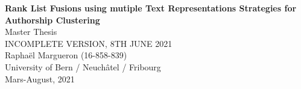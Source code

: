 \documentclass{article}
\theoremstyle{definition}
\begin{document}
\setcounter{page}{-1}

\date{Mars-August, 2021}
\author{Raphaël Margueron}

\begin{titlepage}
\vspace*{\fill}
\begin{center}
{\LARGE \textbf{Rank List Fusions using mutiple Text Representations Strategies for Authorship Clustering}}
\\[0.5cm]
{\large Master Thesis}
\\[0.5cm]
{\large \color{red} INCOMPLETE VERSION, 8TH JUNE 2021}
\\[8.0cm]
{\large Raphaël Margueron (16-858-839)}
\\[0.5cm]
{\large University of Bern / Neuchâtel / Fribourg}
\\[0.5cm]
{\large Mars-August, 2021}
\\[0.5cm]
\end{center}
\vspace*{\fill}
\end{titlepage}

\onecolumn


\twocolumn
{}







\onecolumn
{}
\renewcommand{\thesubsection}{\Alph{subsection}}
\renewcommand{\thetable}{\Alph{table}}
\renewcommand{\thefigure}{\Alph{figure}}
\setcounter{subsection}{0}
\setcounter{table}{0}
\setcounter{figure}{0}


\clearpage

\end{document}
